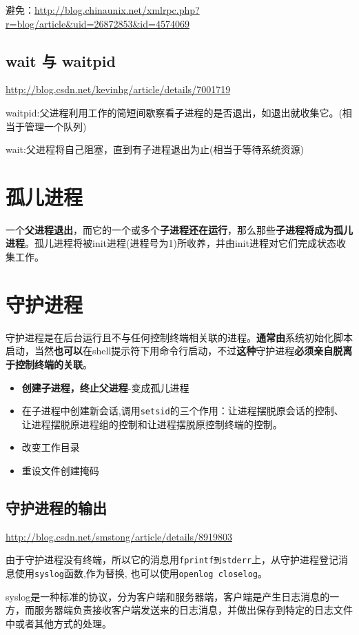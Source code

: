 \documentclass[UTF8,a4paper,12pt]{ctexbook}
\begin{document}
			避免：\url{http://blog.chinaunix.net/xmlrpc.php?r=blog/article&uid=26872853&id=4574069}
			
		\subsection{wait 与 waitpid}
			\url{http://blog.csdn.net/kevinhg/article/details/7001719}
			
			waitpid:父进程利用工作的简短间歇察看子进程的是否退出，如退出就收集它。(相当于管理一个队列)
			
			wait:父进程将自己阻塞，直到有子进程退出为止(相当于等待系统资源)
	\section{孤儿进程}
		一个\textbf{父进程退出}，而它的一个或多个\textbf{子进程还在运行}，那么那些\textbf{子进程将成为孤儿进程}。孤儿进程将被init进程(进程号为1)所收养，并由init进程对它们完成状态收集工作。
				
	\section{守护进程}
		守护进程是在后台运行且不与任何控制终端相关联的进程。\textbf{通常由}系统初始化脚本启动，当然\textbf{也可以}在shell提示符下用命令行启动，不过\textbf{这种}守护进程\textbf{必须亲自脱离于控制终端的关联}。
		
		\begin{itemize}
			\item \textbf{创建子进程，终止父进程}-变成孤儿进程
			\item 在子进程中创建新会话,调用\verb|setsid|的三个作用：让进程摆脱原会话的控制、让进程摆脱原进程组的控制和让进程摆脱原控制终端的控制。
			\item 改变工作目录
			\item 重设文件创建掩码
		\end{itemize}
		
		\subsection{守护进程的输出}
			\url{http://blog.csdn.net/smstong/article/details/8919803}
			
			由于守护进程没有终端，所以它的消息用\verb|fprintf到stderr|上，从守护进程登记消息使用\verb|syslog|函数,作为替换, 也可以使用\verb|openlog closelog|。
						
			syslog是一种标准的协议，分为客户端和服务器端，客户端是产生日志消息的一方，而服务器端负责接收客户端发送来的日志消息，并做出保存到特定的日志文件中或者其他方式的处理。
			
\end{document}
